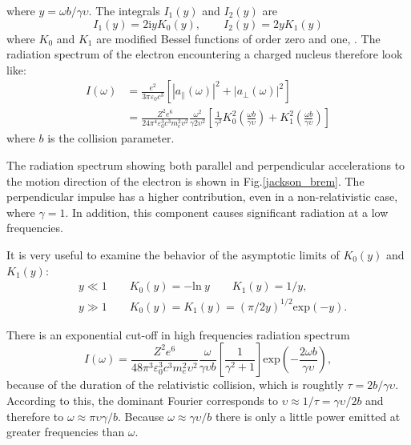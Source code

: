 \documentclass[oneside,a4paper,11pt]{report}
\begin{document}
where $y = \omega b / \gamma \upsilon$. The integrals $I_1(y)$ and $I_2(y)$ are
\begin{equation}
 \label{bremr_int}
I_1(y) = 2 \mathrm{i} y K_0 (y), \qquad I_2(y) = 2y K_1 (y)
\end{equation}
where $K_0$ and $K_1$ are modified Bessel functions of order zero and one, \citet{longair:1}.
The radiation spectrum of the electron encountering a charged nucleus therefore look like: 
\begin{equation}
 \label{rad_spec_brem}
\begin{split}
I(\omega) &= \frac{e^2}{3\pi \varepsilon_0 c^3}\left [ \left | a_\parallel (\omega) \right |^2 + \left | a_\perp (\omega) \right |^2 \right ] \\
&= \frac{Z^2e^6}{24\pi^4 \varepsilon_0^3 c^3 m_e^2 v^2} \frac{\omega^2}{\gamma2 \upsilon^2}\left [ \frac{1}{\gamma^2}K_0^2\left ( \frac{\omega b}{\gamma \upsilon} \right ) + K_1^2 \left ( \frac{\omega b}{\gamma \upsilon} \right ) \right ] 
\end{split}
\end{equation}
where $b$ is the collision parameter. 

The radiation spectrum showing both parallel and perpendicular accelerations to the motion 
direction of the electron is shown in Fig.\ref{jackson_brem}. The perpendicular impulse 
has a higher contribution, even in a non-relativistic case, where $\gamma = 1$.  In addition, 
this component causes significant radiation at a low frequencies.   

It is very useful to examine the behavior of the asymptotic limits of $K_0(y)$ and $K_1(y)$: 
\begin{equation}
 \label{examine_k}
\begin{split}
&y \ll 1 \qquad K_0(y) = -\mathrm{ln} \: y \qquad K_1(y) = 1/y , \\
&y \gg 1 \qquad  K_0(y) =  K_1(y) = (\pi/2y)^{1/2} \mathrm{exp}(-y).    
\end{split}
\end{equation}

There is an exponential cut-off in high frequencies radiation spectrum
\begin{equation}
\label{high_f}
I(\omega) = \frac{Z^2 e^6}{48 \pi^3 \varepsilon_0^3 c^3 m_e^2 \upsilon^2 } \frac{\omega}{\gamma \upsilon b} \left [ \frac{1}{\gamma^2 +1} \right ] \mathrm{exp}\left ( - \frac{2 \omega b}{\gamma \upsilon} \right ), 
\end{equation}
because of the duration of the relativistic collision, 
which is roughtly $\tau = 2b / \gamma \upsilon$. According to this, the dominant Fourier corresponds to 
$\upsilon \approx 1/ \tau = \gamma \upsilon / 2b$ and therefore to $\omega \approx \pi \upsilon \gamma / b$. 
Because $\omega \approx \gamma \upsilon / b$ there is only a little power emitted at greater frequencies 
than $\omega$. 
\end{document}
